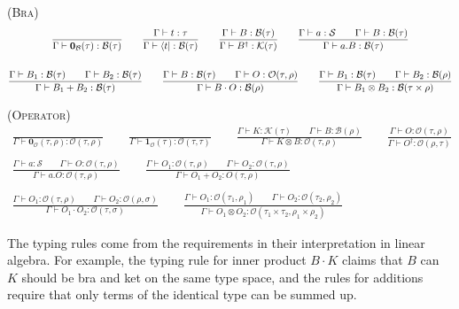 \documentclass[manuscript, review, timestamp]{acmart}
\newcommand*{\Sc}{\mathcal{S}}
\newcommand*{\K}{\mathcal{K}}
\newcommand*{\B}{\mathcal{B}}
\newcommand*{\Op}{\mathcal{O}}
\begin{document}
\textsc{(Bra)}
\begin{gather*}
  \frac{}{\Gamma \vdash \mathbf{0}_{\mathcal{B}}(\tau) : \B(\tau)}
  \qquad
  \frac{\Gamma \vdash t : \tau}{\Gamma \vdash \bra{t} : \B(\tau)}
  \qquad
  \frac{\Gamma \vdash B : \B(\tau)}{\Gamma \vdash B^\dagger : \K(\tau)}
  \qquad
  \frac{\Gamma \vdash a : \Sc \qquad \Gamma \vdash B : \B(\tau)}{\Gamma \vdash a . B : \B(\tau)} \\
  \\
  \frac{\Gamma \vdash B_1 : \B(\tau) \qquad \Gamma \vdash B_2 : \B(\tau) }{\Gamma \vdash B_1 + B_2 : \B(\tau) }
  \qquad
  \frac{\Gamma \vdash B : \B(\tau) \qquad \Gamma \vdash O : \Op(\tau, \rho) }{\Gamma \vdash B \cdot O : \B(\rho) } 
  \qquad
  \frac{\Gamma \vdash B_1 : \B(\tau) \qquad \Gamma \vdash B_2 : \B(\rho) }{\Gamma \vdash B_1 \otimes B_2 : \B(\tau \times \rho)}
\end{gather*}

\textsc{(Operator)}
\begin{gather*}
  \frac{}{\Gamma \vdash \mathbf{0}_{\mathcal{O}}(\tau, \rho) : \Op(\tau, \rho)}
  \qquad
  \frac{}{\Gamma \vdash \mathbf{1}_{\mathcal{O}}(\tau) : \Op(\tau, \tau)}
  \qquad
  \frac{\Gamma \vdash K : \K(\tau) \qquad \Gamma \vdash B : \B(\rho) }{\Gamma \vdash K \otimes B : \Op(\tau, \rho)}
  \qquad
  \frac{\Gamma \vdash O : \Op(\tau, \rho)}{\Gamma \vdash O^\dagger : \Op(\rho, \tau)} \\
  \\
  \frac{\Gamma \vdash a : \Sc \qquad \Gamma \vdash O : \Op(\tau, \rho)}{\Gamma \vdash a . O : \Op(\tau, \rho)}
  \qquad
  \frac{\Gamma \vdash O_1 : \Op(\tau, \rho) \qquad \Gamma \vdash O_2 : \Op(\tau, \rho) }{\Gamma \vdash O_1 + O_2 : O(\tau, \rho) } \\
  \\
  \frac{\Gamma \vdash O_1 : \Op(\tau, \rho) \qquad \Gamma \vdash O_2 : \Op(\rho, \sigma) }{\Gamma \vdash O_1 \cdot O_2 : \Op(\tau, \sigma) }
  \qquad
  \frac{\Gamma \vdash O_1 : \Op(\tau_1, \rho_1) \qquad \Gamma \vdash O_2 : \Op(\tau_2, \rho_2) }{\Gamma \vdash O_1 \otimes O_2 : \Op(\tau_1 \times \tau_2, \rho_1 \times \rho_2)}
\end{gather*}

The typing rules come from the requirements in their interpretation in linear algebra. For example, the typing rule for inner product $B\cdot K$ claims that $B$ can $K$ should be bra and ket on the same type space, and the rules for additions require that only terms of the identical type can be summed up.
\end{document}
